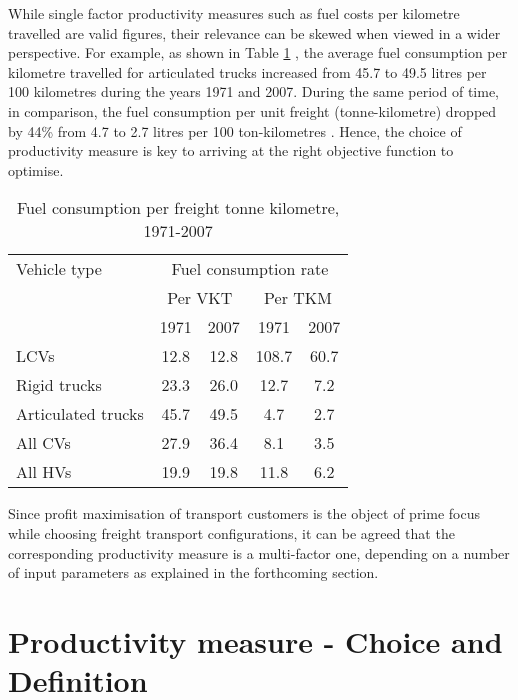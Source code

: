 \documentclass[ExampleMasters.tex]{subfiles}
\begin{document}
		While single factor productivity measures such as fuel costs per kilometre travelled are valid figures, their relevance can be skewed when viewed in a wider perspective. For example, as shown in Table \ref{table:fuelConsumptionRate} \cite[T.~2.8]{TruckProdAus}, the average fuel consumption per kilometre travelled for articulated trucks increased from 45.7 to 49.5 litres per 100 kilometres during the years 1971 and 2007. During the same period of time, in comparison, the fuel consumption per unit freight (tonne-kilometre) dropped by 44\% from 4.7 to 2.7 litres per 100 ton-kilometres \cite{TruckProdAus}. Hence, the choice of productivity measure is key to arriving at the right objective function to optimise.\\

		\begin{table}[ht]
			\centering 
			\begin{tabular}{l c c c c}
  			\hline
			Vehicle type & \multicolumn{4}{c}{Fuel consumption rate}\\ \cline{2-3} \cline{4-5}
			\ & \multicolumn{2}{c}{Per VKT} & \multicolumn{2}{c}{Per TKM}\\ \cline{2-3} \cline{4-5}
			\ & 1971 & 2007 & 1971 & 2007\\ \hline
			    LCVs  & 12.8 & 12.8 & 108.7 & 60.7\\
			    Rigid trucks  & 23.3 & 26.0 & 12.7  & 7.2\\
			    Articulated trucks  & 45.7 & 49.5 & 4.7 & 2.7  \\
			    All CVs  & 27.9 & 36.4 & 8.1 & 3.5 \\
			    All HVs  & 19.9 & 19.8 & 11.8 & 6.2 \\
			\hline 
			\end{tabular}
			\caption{Fuel consumption per freight tonne kilometre, 1971-2007 \cite{TruckProdAus}} 
			\label{table:fuelConsumptionRate} 
		\end{table}

		Since profit maximisation of transport customers is the object of prime focus while choosing freight transport configurations, it can be agreed that the corresponding productivity measure is a multi-factor one, depending on a number of input parameters as explained in the forthcoming section.\\

	\section{Productivity measure - Choice and Definition}
\end{document}
